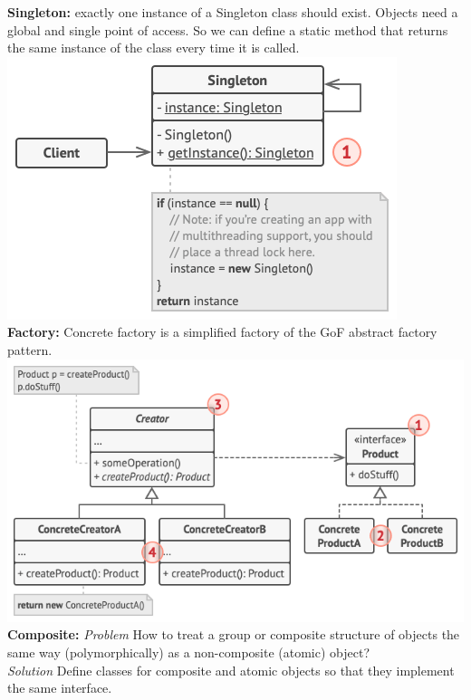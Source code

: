 \textbf{Singleton:} exactly one instance of a Singleton class should exist. Objects need a global and single point of access. So we can define a static method that returns the same instance of the class every time it is called.\\
\includegraphics[width=\linewidth]{figs/singleton.png}\\
\textbf{Factory:} Concrete factory is a simplified factory of the GoF abstract factory pattern.\\
\includegraphics[width=\linewidth]{figs/factory.png}\\
\textbf{Composite:} \textit{Problem} How to treat a group or composite structure of objects the same way (polymorphically) as a non-composite (atomic) object?\\
\textit{Solution} Define classes for composite and atomic objects so that they implement the same interface.\\
